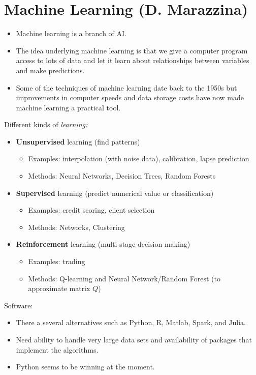 
\chapter{Machine Learning (D. Marazzina)}

\begin{itemize}
    \item Machine learning is a branch of AI.
    \item The idea underlying machine learning is that we give a computer program access to lots of data and let it learn about relationships between variables and make predictions.
    \item Some of the techniques of machine learning date back to the 1950s but improvements in computer speeds and data storage costs have now made machine learning a practical tool.
\end{itemize}

Different kinds of \textit{learning:}
\begin{itemize}
    \item \textbf{Unsupervised} learning (find patterns)
          \begin{itemize}
              \item Examples: interpolation (with noise data), calibration, lapse prediction 
              \item Methods: Neural Networks, Decision Trees, Random Forests
          \end{itemize}
    \item \textbf{Supervised} learning (predict numerical value or classification)
          \begin{itemize}
              \item Examples: credit scoring, client selection
              \item Methods: Networks, Clustering
          \end{itemize}
    \item \textbf{Reinforcement} learning (multi-stage decision making)
          \begin{itemize}
              \item Examples: trading
              \item Methods: Q-learning and Neural Network/Random Forest (to approximate matrix $Q$)
          \end{itemize}
\end{itemize}

Software:
\begin{itemize}
    \item There a several alternatives such as Python, R, Matlab, Spark, and Julia.
    \item Need ability to handle very large data sets and availability of packages that implement the algorithms.
    \item Python seems to be winning at the moment.
\end{itemize}

